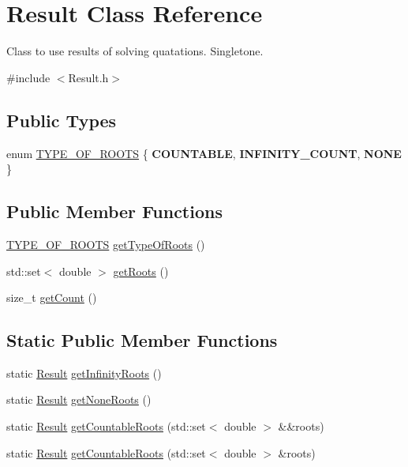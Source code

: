 \hypertarget{classResult}{}\section{Result Class Reference}
\label{classResult}


Class to use results of solving quatations. Singletone.  




{\ttfamily \#include $<$Result.\+h$>$}

\subsection*{Public Types}
\begin{DoxyCompactItemize}
\item 
enum \hyperlink{classResult_ae4448d298878f49e7adf0c7a9908f2e5}{T\+Y\+P\+E\+\_\+\+O\+F\+\_\+\+R\+O\+O\+TS} \{ {\bfseries C\+O\+U\+N\+T\+A\+B\+LE}, 
{\bfseries I\+N\+F\+I\+N\+I\+T\+Y\+\_\+\+C\+O\+U\+NT}, 
{\bfseries N\+O\+NE}
 \}
\end{DoxyCompactItemize}
\subsection*{Public Member Functions}
\begin{DoxyCompactItemize}
\item 
\hyperlink{classResult_ae4448d298878f49e7adf0c7a9908f2e5}{T\+Y\+P\+E\+\_\+\+O\+F\+\_\+\+R\+O\+O\+TS} \hyperlink{classResult_a31f11436c4ec4716acfc281893f16297}{get\+Type\+Of\+Roots} ()
\item 
std\+::set$<$ double $>$ \hyperlink{classResult_a3d480d756c97fa635e7ad4e6044dd828}{get\+Roots} ()
\item 
size\+\_\+t \hyperlink{classResult_a8975ae2fbaaf559f9db4bb52e050b294}{get\+Count} ()
\end{DoxyCompactItemize}
\subsection*{Static Public Member Functions}
\begin{DoxyCompactItemize}
\item 
static \hyperlink{classResult}{Result} \hyperlink{classResult_ae80743c03328802c58ee712ffc901f7e}{get\+Infinity\+Roots} ()
\item 
static \hyperlink{classResult}{Result} \hyperlink{classResult_aa295438130675921abb93d72818f8e19}{get\+None\+Roots} ()
\item 
static \hyperlink{classResult}{Result} \hyperlink{classResult_a96fd5f4460fb7b17a7e0e7f35c44e97c}{get\+Countable\+Roots} (std\+::set$<$ double $>$ \&\&roots)
\item 
static \hyperlink{classResult}{Result} \hyperlink{classResult_a4fd93039999c369636e4b9c9a5a23d6c}{get\+Countable\+Roots} (std\+::set$<$ double $>$ \&roots)
\end{DoxyCompactItemize}


